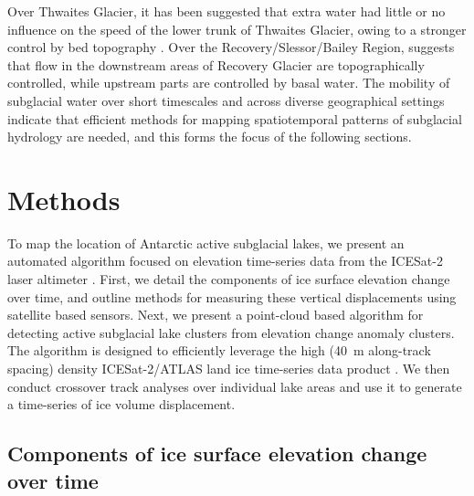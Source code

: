 Over Thwaites Glacier, it has been suggested that extra water had little or no influence on the speed of the lower trunk of Thwaites Glacier, owing to a stronger control by bed topography \citep{SmithConnectedsubglaciallake2017,HoffmanBriefCommunicationHeterogenous2020}.
Over the Recovery/Slessor/Bailey Region, \citet{DiezBasalSettingsControl2018} suggests that flow in the downstream areas of Recovery Glacier are topographically controlled, while upstream parts are controlled by basal water.
The mobility of subglacial water over short timescales and across diverse geographical settings indicate that efficient methods for mapping spatiotemporal patterns of subglacial hydrology are needed, and this forms the focus of the following sections.

\clearpage
\section{Methods}

To map the location of Antarctic active subglacial lakes, we present an automated algorithm focused on elevation time-series data from the ICESat-2 laser altimeter \citep{MarkusIceCloudland2017,NeumannIceCloudLand2019}.
First, we detail the components of ice surface elevation change over time, and outline methods for measuring these vertical displacements using satellite based sensors.
Next, we present a point-cloud based algorithm for detecting active subglacial lake clusters from elevation change anomaly clusters.
The algorithm is designed to efficiently leverage the high (\SI{40}{m} along-track spacing) density ICESat-2/ATLAS land ice time-series data product \citep[ATL11;][]{SmithATLASICESat2L3B2021}.
We then conduct crossover track analyses over individual lake areas and use it to generate a time-series of ice volume displacement.


\subsection{Components of ice surface elevation change over time} \label{sec:componentsofdhdt}


